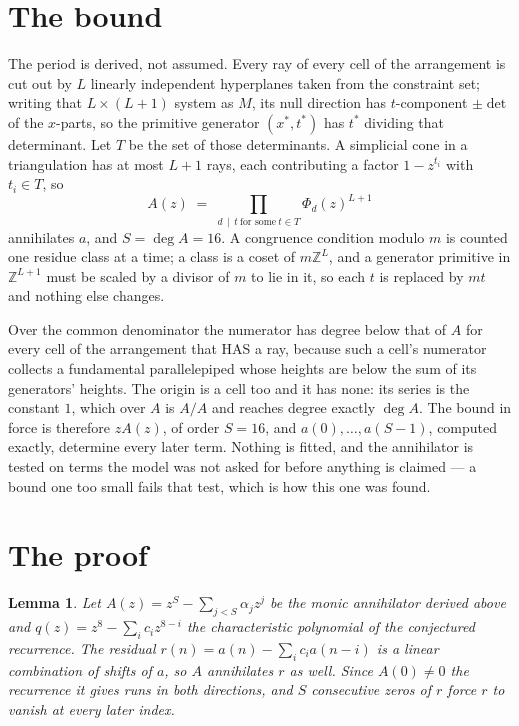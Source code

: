 \documentclass[11pt,a4paper]{article}
\theoremstyle{plain}
\newtheorem{lemma}[theorem]{Lemma}
\theoremstyle{definition}
\begin{document}
\section{The bound}

The period is derived, not assumed. Every ray of every cell of the arrangement is cut out by
$L$ linearly independent hyperplanes taken from the constraint set; writing that $L\times(L+1)$
system as $M$, its null direction has $t$-component $\pm\det$ of the $x$-parts, so the
primitive generator $(x^*,t^*)$ has $t^*$ dividing that determinant. Let $T$ be the set of
those determinants. A simplicial cone in a triangulation has at most $L+1$ rays, each
contributing a factor $1-z^{t_i}$ with $t_i\in T$, so
\[
A(z)\;=\;\prod_{d\,\mid\,t\ \text{for some}\ t\in T}\Phi_d(z)^{L+1}
\]
annihilates $a$, and $S=\deg A=16$. A congruence condition modulo $m$ is counted one residue
class at a time; a class is a coset of $m\mathbb{Z}^L$, and a generator primitive in
$\mathbb{Z}^{L+1}$ must be scaled by a divisor of $m$ to lie in it, so each $t$ is replaced
by $mt$ and nothing else changes.

Over the common denominator the numerator has degree below that of $A$ for every cell of the
arrangement that HAS a ray, because such a cell's numerator collects a fundamental
parallelepiped whose heights are below the sum of its generators' heights. The origin is a cell
too and it has none: its series is the constant $1$, which over $A$ is $A/A$ and reaches degree
exactly $\deg A$. The bound in force is therefore $zA(z)$, of order $S=16$, and
$a(0),\dots,a(S-1)$, computed exactly, determine every later term. Nothing is fitted, and the
annihilator is tested on terms the model was not asked for before anything is claimed --- a
bound one too small fails that test, which is how this one was found.

\section{The proof}

\begin{lemma}\label{lem:crit}
Let $A(z)=z^S-\sum_{j<S}\alpha_jz^{j}$ be the monic annihilator derived above and
$q(z)=z^{8}-\sum_ic_iz^{8-i}$ the characteristic polynomial of the conjectured
recurrence. The residual $r(n)=a(n)-\sum_ic_ia(n-i)$ is a linear combination of shifts of $a$,
so $A$ annihilates $r$ as well. Since $A(0)\ne0$ the recurrence it gives runs in both
directions, and $S$ consecutive zeros of $r$ force $r$ to vanish at every later index.
\end{lemma}
\end{document}

